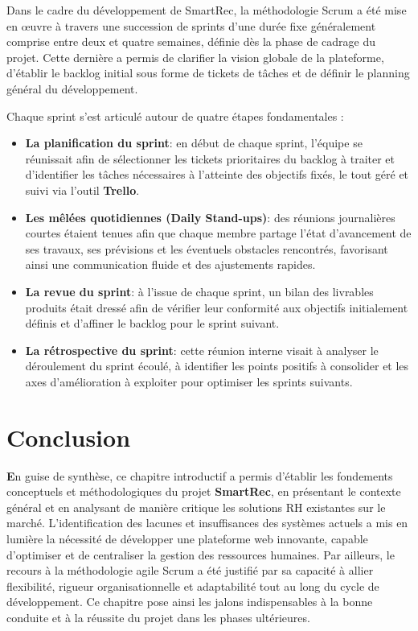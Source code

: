 Dans le cadre du développement de SmartRec, la méthodologie Scrum a été mise en œuvre à travers une succession de sprints d'une durée fixe généralement comprise entre deux et quatre semaines, définie dès la phase de cadrage du projet. Cette dernière a permis de clarifier la vision globale de la plateforme, d'établir le backlog initial sous forme de tickets de tâches et de définir le planning général du développement. 

\par Chaque sprint s'est articulé autour de quatre étapes fondamentales :
\begin{itemize}[label=\textbullet]
\item \textbf{La planification du sprint}: en début de chaque sprint, l'équipe se réunissait afin de sélectionner les tickets prioritaires du backlog à traiter et d'identifier les tâches nécessaires à l'atteinte des objectifs fixés, le tout géré et suivi via l'outil \textbf{Trello}.

\item \textbf{Les mêlées quotidiennes (Daily Stand-ups)}: des réunions journalières courtes étaient tenues afin que chaque membre partage l'état d'avancement de ses travaux, ses prévisions et les éventuels obstacles rencontrés, favorisant ainsi une communication fluide et des ajustements rapides.


\item \textbf{La revue du sprint}: à l'issue de chaque sprint, un bilan des livrables produits était dressé afin de vérifier leur conformité aux objectifs initialement définis et d'affiner le backlog pour le sprint suivant.

\item \textbf{La rétrospective du sprint}: cette réunion interne visait à analyser le déroulement du sprint écoulé, à identifier les points positifs à consolider et les axes d'amélioration à exploiter pour optimiser les sprints suivants.


\end{itemize}

\section*{Conclusion} %
\hspace{0.5cm}\textbf
En guise de synthèse, ce chapitre introductif a permis d'établir les fondements conceptuels et méthodologiques du projet \textbf{SmartRec}, en présentant le contexte général et en analysant de manière critique les solutions RH existantes sur le marché. L'identification des lacunes et insuffisances des systèmes actuels a mis en lumière la nécessité de développer une plateforme web innovante, capable d'optimiser et de centraliser la gestion des ressources humaines. Par ailleurs, le recours à la méthodologie agile Scrum a été justifié par sa capacité à allier flexibilité, rigueur organisationnelle et adaptabilité tout au long du cycle de développement. Ce chapitre pose ainsi les jalons indispensables à la bonne conduite et à la réussite du projet dans les phases ultérieures.



